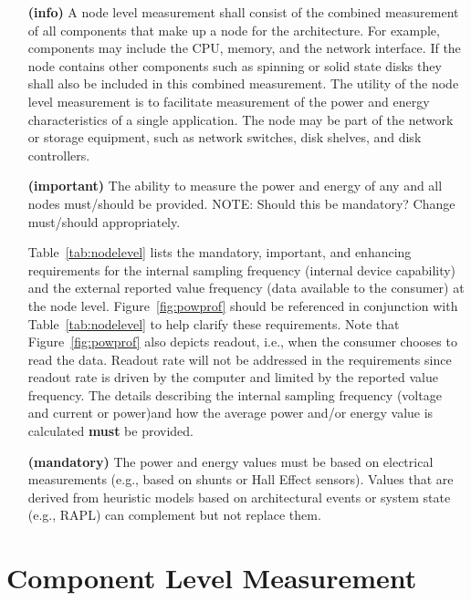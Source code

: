 \begin{itemize}

\item[\textbf{(info)}]
A node level measurement shall consist of the combined measurement of all components that 
make up a node for the architecture. For example, components may include the CPU, memory, 
and the network interface. If the node contains other components such as spinning or solid 
state disks they shall also be included in this combined measurement. The utility of the 
node level measurement is to facilitate measurement of the power and energy characteristics 
of a single application. The node may be part of the network or storage equipment, such 
as network switches, disk shelves, and disk controllers.   

\item[\textbf{(important)}]
The ability to measure the power and energy of any and all nodes must/should 
be provided.  NOTE: Should this be mandatory? Change must/should appropriately.

Table~\ref{tab:nodelevel} lists the mandatory, important, and enhancing requirements 
for the internal sampling frequency (internal device capability) and the external 
reported value frequency (data available to the consumer) at the node level. Figure~\ref{fig:powprof}
should be referenced in conjunction with Table~\ref{tab:nodelevel} to help clarify 
these requirements. Note that Figure~\ref{fig:powprof} also depicts readout, i.e., when 
the consumer chooses to read the data. Readout rate will not be addressed in the 
requirements since readout rate is driven by the computer and limited by the reported 
value frequency. The details describing the internal sampling frequency (voltage and 
current or power)and how the average power and/or energy value is calculated \textbf{must} be provided.

\item[\textbf{(mandatory)}]
The power and energy values must be based on electrical measurements (e.g., based on shunts 
or Hall Effect sensors). Values that are derived from heuristic models based on 
architectural events or system state (e.g., RAPL) can complement but not replace them.
\end{itemize}


\section{Component Level Measurement}

